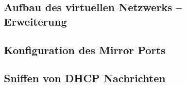 \subsection{Aufbau des virtuellen Netzwerks – Erweiterung}

\subsection{Konfiguration des Mirror Ports}

\clearpage
\pagebreak
\subsection{Sniffen von DHCP Nachrichten}

